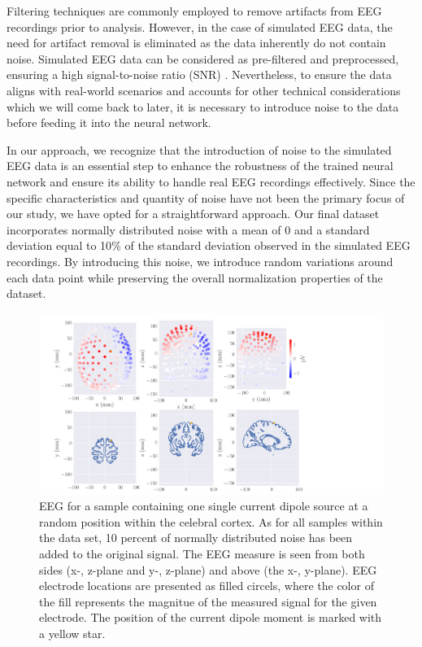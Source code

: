 \documentclass[a4paper, UKenglish, 11pt]{uiomaster}
\begin{document}
Filtering techniques are commonly employed to remove artifacts from EEG recordings prior to analysis. However, in the case of simulated EEG data, the need for artifact removal is eliminated as the data inherently do not contain noise. Simulated EEG data can be considered as pre-filtered and preprocessed, ensuring a high signal-to-noise ratio (SNR) \cite{wiki-snr}. Nevertheless, to ensure the data aligns with real-world scenarios and accounts for other technical considerations which we will come back to later, it is necessary to introduce noise to the data before feeding it into the neural network.

In our approach, we recognize that the introduction of noise to the simulated EEG data is an essential step to enhance the robustness of the trained neural network and ensure its ability to handle real EEG recordings effectively. Since the specific characteristics and quantity of noise have not been the primary focus of our study, we have opted for a straightforward approach. Our final dataset incorporates normally distributed noise with a mean of 0 and a standard deviation equal to 10$\%$ of the standard deviation observed in the simulated EEG recordings. By introducing this noise, we introduce random variations around each data point while preserving the overall normalization properties of the dataset.

\begin{figure}[!htb]
    \centering
    \includegraphics[width=\linewidth]{figures/simple_example.pdf}
    \caption{EEG for a sample containing one single current dipole source at a random position within the celebral cortex. As for all samples within the data set, 10 percent of normally distributed noise has been added to the original signal. The EEG measure is seen from both sides (x-, z-plane and y-, z-plane) and above (the x-, y-plane). EEG electrode locations are presented as filled circels, where the color of the fill represents the magnitue of the measured signal for the given electrode. The position of the current dipole moment is marked with a yellow star.}
    \label{fig:eeg_field_1_dipole_example}
\end{figure}
\end{document}

